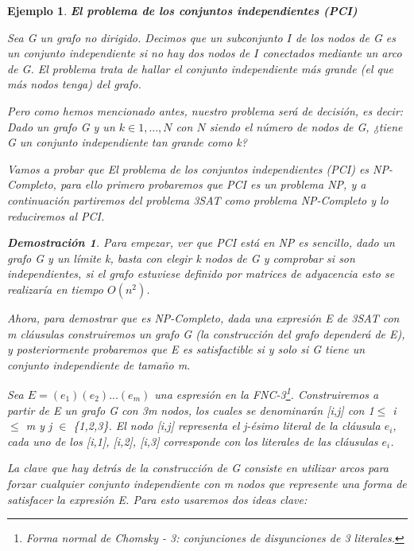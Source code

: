 \documentclass[a4paper,12pt,titlepage]{article}
\newtheorem{eje}{Ejemplo}[section]
\newtheorem*{dem}{\textbf{Demostraci\'on}}
\begin{document}
\begin{eje}

\textbf{El problema de los conjuntos independientes (PCI)}
\vspace{\baselineskip}

Sea G un grafo no dirigido. Decimos que un subconjunto $I$ de los nodos de G es un conjunto independiente si no hay dos nodos de $I$ conectados mediante un arco de G. El problema trata de hallar el conjunto independiente m\'as grande (el que m\'as nodos tenga) del grafo.

Pero como hemos mencionado antes, nuestro problema ser\'a de decisi\'on, es decir: Dado un grafo G y un $k \in {1,...,N}$ con $N$ siendo el n\'umero de nodos de G, ¿tiene G un conjunto independiente tan grande como k?

Vamos a probar que El problema de los conjuntos independientes (PCI) es NP-Completo, para ello primero probaremos que PCI\cite{HopcroftESP} es un problema NP, y a continuaci\'on partiremos del problema 3SAT como problema NP-Completo y lo reduciremos al PCI.

\begin{dem}

Para empezar, ver que PCI est\'a en NP es sencillo, dado un grafo G y un l\'imite k, basta con elegir k nodos de G y comprobar si son independientes, si el grafo estuviese definido por matrices de adyacencia esto se realizar\'ia en tiempo $O(n^{2})$.

Ahora, para demostrar que es NP-Completo, dada una expresi\'on E de 3SAT con m cl\'ausulas construiremos un grafo G (la construcci\'on del grafo depender\'a de E), y posteriormente probaremos que E es satisfactible si y solo si G tiene un conjunto independiente de tamaño m.

Sea $E = (e_1)(e_2)...(e_m)$ una espresi\'on en la FNC-3\footnote{Forma normal de Chomsky - 3: conjunciones de disyunciones de 3 literales.}. Construiremos a partir de E un grafo G con 3m nodos, los cuales se denominar\'an [i,j] con 1$\leq$ i $\leq $ m y j $\in$ \{1,2,3\}. El nodo [i,j] representa el j-\'esimo literal de la cl\'ausula $e_i$, cada uno de los [i,1], [i,2], [i,3] corresponde con los literales de las cl\'ausulas $e_i$.

La clave que hay detr\'as de la construcci\'on de G consiste en utilizar arcos para forzar cualquier conjunto independiente con m nodos que represente una forma de satisfacer la expresi\'on E. Para esto usaremos dos ideas clave:

\begin{enumerate}


\end{enumerate}
\end{dem}
\end{eje}
\end{document}
